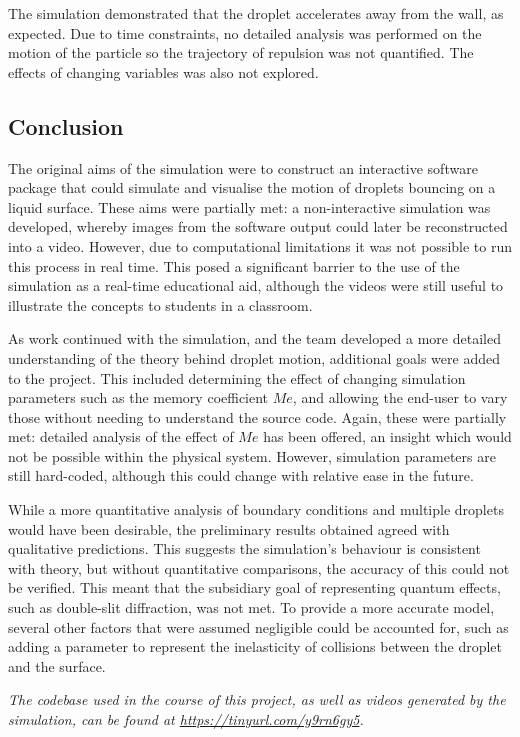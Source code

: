 The simulation demonstrated that the droplet accelerates away from the wall, as expected. Due to time constraints, no detailed analysis was performed on the motion of the particle so the trajectory of repulsion was not quantified. The effects of changing variables was also not explored.


\subsection{Conclusion}

The original aims of the simulation were to construct an interactive software package that could simulate and visualise the motion of droplets bouncing on a liquid surface. These aims were partially met: a non-interactive simulation was developed, whereby images from the software output could later be reconstructed into a video. However, due to computational limitations it was not possible to run this process in real time. This posed a significant barrier to the use of the simulation as a real-time educational aid, although the videos were still useful to illustrate the concepts to students in a classroom.

As work continued with the simulation, and the team developed a more detailed understanding of the theory behind droplet motion, additional goals were added to the project. This included determining the effect of changing simulation parameters such as the memory coefficient $Me$, and allowing the end-user to vary those without needing to understand the source code. Again, these were partially met: detailed analysis of the effect of $Me$ has been offered, an insight which would not be possible within the physical system. However, simulation parameters are still hard-coded, although this could change with relative ease in the future.

While a more quantitative analysis of boundary conditions and multiple droplets would have been desirable, the preliminary results obtained agreed with qualitative predictions. This suggests the simulation's behaviour is consistent with theory, but without quantitative comparisons, the accuracy of this could not be verified. This meant that the subsidiary goal of representing quantum effects, such as double-slit diffraction, was not met. To provide a more accurate model, several other factors that were assumed negligible could be accounted for, such as adding a parameter to represent the inelasticity of collisions between the droplet and the surface.

\textit{The codebase used in the course of this project, as well as videos generated by the simulation, can be found at \url{https://tinyurl.com/y9rn6gy5}.}
